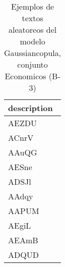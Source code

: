 \begin{table}[H]
\centering
\fontsize{8}{14}\selectfont
\caption{Ejemplos de textos aleatoreos del modelo Gaussiancopula, conjunto Economicos (B-3)}
\label{table-sample10-economicos-b-3-gaussiancopula-text}
\begin{tabular}{|m{50em}|}
\hline
\rowcolor[gray]{0.8}
description \\
\hline AEZDU \\
\hline ACnrV \\
\hline AAuQG \\
\hline AESne \\
\hline ADSJl \\
\hline AAdqy \\
\hline AAPUM \\
\hline AEgiL \\
\hline AEAmB \\
\hline ADQUD \\
\hline
\end{tabular}
\end{table}
